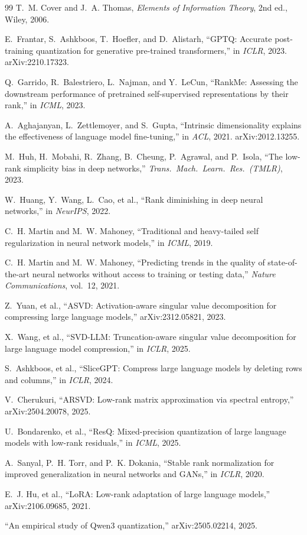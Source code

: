 \documentclass[11pt,a4paper]{article}
\begin{document}
\begin{thebibliography}{99}
T.~M. Cover and J.~A. Thomas, \textit{Elements of Information Theory}, 2nd ed., Wiley, 2006.

E.~Frantar, S.~Ashkboos, T.~Hoefler, and D.~Alistarh, ``GPTQ: Accurate post-training quantization for generative pre-trained transformers,'' in \textit{ICLR}, 2023. arXiv:2210.17323.

Q.~Garrido, R.~Balestriero, L.~Najman, and Y.~LeCun, ``RankMe: Assessing the downstream performance of pretrained self-supervised representations by their rank,'' in \textit{ICML}, 2023.

A.~Aghajanyan, L.~Zettlemoyer, and S.~Gupta, ``Intrinsic dimensionality explains the effectiveness of language model fine-tuning,'' in \textit{ACL}, 2021. arXiv:2012.13255.

M.~Huh, H.~Mobahi, R.~Zhang, B.~Cheung, P.~Agrawal, and P.~Isola, ``The low-rank simplicity bias in deep networks,'' \textit{Trans.\ Mach.\ Learn.\ Res.\ (TMLR)}, 2023.

W.~Huang, Y.~Wang, L.~Cao, et al., ``Rank diminishing in deep neural networks,'' in \textit{NeurIPS}, 2022.

C.~H. Martin and M.~W. Mahoney, ``Traditional and heavy-tailed self regularization in neural network models,'' in \textit{ICML}, 2019.

C.~H. Martin and M.~W. Mahoney, ``Predicting trends in the quality of state-of-the-art neural networks without access to training or testing data,'' \textit{Nature Communications}, vol.~12, 2021.

Z.~Yuan, et al., ``ASVD: Activation-aware singular value decomposition for compressing large language models,'' arXiv:2312.05821, 2023.

X.~Wang, et al., ``SVD-LLM: Truncation-aware singular value decomposition for large language model compression,'' in \textit{ICLR}, 2025.

S.~Ashkboos, et al., ``SliceGPT: Compress large language models by deleting rows and columns,'' in \textit{ICLR}, 2024.

V.~Cherukuri, ``ARSVD: Low-rank matrix approximation via spectral entropy,'' arXiv:2504.20078, 2025.

U.~Bondarenko, et al., ``ResQ: Mixed-precision quantization of large language models with low-rank residuals,'' in \textit{ICML}, 2025.

A.~Sanyal, P.~H. Torr, and P.~K. Dokania, ``Stable rank normalization for improved generalization in neural networks and GANs,'' in \textit{ICLR}, 2020.

E.~J. Hu, et al., ``LoRA: Low-rank adaptation of large language models,'' arXiv:2106.09685, 2021.

``An empirical study of Qwen3 quantization,'' arXiv:2505.02214, 2025.

\end{thebibliography}
\end{document}
